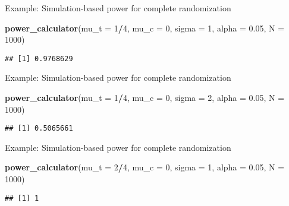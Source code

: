 \documentclass[
  ignorenonframetext,
]{beamer}
\newenvironment{Shaded}{\begin{snugshade}}{\end{snugshade}}
\newcommand{\DataTypeTok}[1]{\textcolor[rgb]{0.13,0.29,0.53}{#1}}
\newcommand{\DecValTok}[1]{\textcolor[rgb]{0.00,0.00,0.81}{#1}}
\newcommand{\FloatTok}[1]{\textcolor[rgb]{0.00,0.00,0.81}{#1}}
\newcommand{\KeywordTok}[1]{\textcolor[rgb]{0.13,0.29,0.53}{\textbf{#1}}}
\newcommand{\NormalTok}[1]{#1}
\newcommand{\OperatorTok}[1]{\textcolor[rgb]{0.81,0.36,0.00}{\textbf{#1}}}
\begin{document}
\begin{frame}[fragile]{Example: Simulation-based power for complete
randomization}
\protect\hypertarget{example-simulation-based-power-for-complete-randomization-2}{}
\begin{Shaded}
\begin{Highlighting}[]
\KeywordTok{power\_calculator}\NormalTok{(}\DataTypeTok{mu\_t =} \DecValTok{1}\OperatorTok{/}\DecValTok{4}\NormalTok{, }\DataTypeTok{mu\_c =} \DecValTok{0}\NormalTok{, }\DataTypeTok{sigma =} \DecValTok{1}\NormalTok{,}
    \DataTypeTok{alpha =} \FloatTok{0.05}\NormalTok{, }\DataTypeTok{N =} \DecValTok{1000}\NormalTok{)}
\end{Highlighting}
\end{Shaded}

\begin{verbatim}
## [1] 0.9768629
\end{verbatim}
\end{frame}

\begin{frame}[fragile]{Example: Simulation-based power for complete
randomization}
\protect\hypertarget{example-simulation-based-power-for-complete-randomization-3}{}
\begin{Shaded}
\begin{Highlighting}[]
\KeywordTok{power\_calculator}\NormalTok{(}\DataTypeTok{mu\_t =} \DecValTok{1}\OperatorTok{/}\DecValTok{4}\NormalTok{, }\DataTypeTok{mu\_c =} \DecValTok{0}\NormalTok{, }\DataTypeTok{sigma =} \DecValTok{2}\NormalTok{,}
    \DataTypeTok{alpha =} \FloatTok{0.05}\NormalTok{, }\DataTypeTok{N =} \DecValTok{1000}\NormalTok{)}
\end{Highlighting}
\end{Shaded}

\begin{verbatim}
## [1] 0.5065661
\end{verbatim}
\end{frame}

\begin{frame}[fragile]{Example: Simulation-based power for complete
randomization}
\protect\hypertarget{example-simulation-based-power-for-complete-randomization-4}{}
\begin{Shaded}
\begin{Highlighting}[]
\KeywordTok{power\_calculator}\NormalTok{(}\DataTypeTok{mu\_t =} \DecValTok{2}\OperatorTok{/}\DecValTok{4}\NormalTok{, }\DataTypeTok{mu\_c =} \DecValTok{0}\NormalTok{, }\DataTypeTok{sigma =} \DecValTok{1}\NormalTok{,}
    \DataTypeTok{alpha =} \FloatTok{0.05}\NormalTok{, }\DataTypeTok{N =} \DecValTok{1000}\NormalTok{)}
\end{Highlighting}
\end{Shaded}

\begin{verbatim}
## [1] 1
\end{verbatim}
\end{frame}
\end{document}

